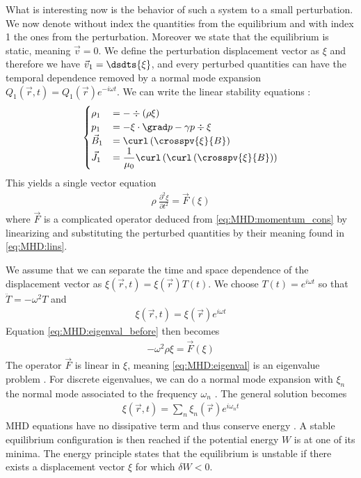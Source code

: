 What is interesting now is the behavior of such a system to a small perturbation. We now denote without index the quantities from the equilibrium and with index 1 the ones from the perturbation. Moreover we state that the equilibrium is static, meaning $\vec{v} = 0$. We define the perturbation displacement vector as $\xi$ and therefore we have $\vec{v}_1 = \dsdts{\xi}$, and every perturbed quantities can have the temporal dependence removed by a normal mode expansion $Q_1(\vec{r},t) = Q_1(\vec{r}) e^{- i \omega t}$. We can write the linear stability equations \cite{freidberg}:
\begin{align}
	\begin{cases}
		\rho_1    & = - \div \left( \rho \xi \right)\\
		p_1       & = - \xi \cdot \grad p - \gamma p \div \xi\\
		\vec{B}_1 & = \curl \left( \crosspv{\xi}{B} \right)\\
		\vec{J}_1 & = \dfrac{1}{\mu_0} \curl \left( \curl \left( \crosspv{\xi}{B} \right) \right)
	\end{cases}\label{eq:MHD:lins}
\end{align}
This yields a single vector equation
\begin{align}
	\rho\ \frac{\partial^2 \xi}{\partial t^2} = \vec{F}(\xi)\label{eq:MHD:eigenval_before}
\end{align}
where $\vec{F}$ is a complicated operator deduced from \eqref{eq:MHD:momentum_cons} by linearizing and substituting the perturbed quantities by their meaning found in \eqref{eq:MHD:lins}.

We assume that we can separate the time and space dependence of the displacement vector as $\xi(\vec{r},t) = \xi(\vec{r}) T(t)$. We choose $T(t) = e^{i \omega t}$ so that $\ddot{T} = - \omega^2 T$ and \cite{boyd-sanderson}
\begin{align}
	\xi(\vec{r},t) = \xi(\vec{r}) e^{i \omega t}\label{eq:MHD:xiexp}
\end{align}
Equation \eqref{eq:MHD:eigenval_before} then becomes
\begin{align}
	- \omega^2 \rho \xi = \vec{F}(\xi)\label{eq:MHD:eigenval}
\end{align}
The operator $\vec{F}$ is linear in $\xi$, meaning \eqref{eq:MHD:eigenval} is an eigenvalue problem \cite{boyd-sanderson}. %
For discrete eigenvalues, we can do a normal mode expansion with $\xi_n$ the normal mode associated to the frequency $\omega_n$ \cite{boyd-sanderson}. The general solution becomes
\begin{align*}
	\xi(\vec{r},t) = \sum_n \xi_n(\vec{r}) e^{i \omega_n t}
\end{align*}
MHD equations have no dissipative term and thus conserve energy \cite{boyd-sanderson}. A stable equilibrium configuration is then reached if the potential energy $W$ is at one of its minima. The energy principle states that the equilibrium is unstable if there exists a displacement vector $\xi$ for which $\delta W < 0$.

